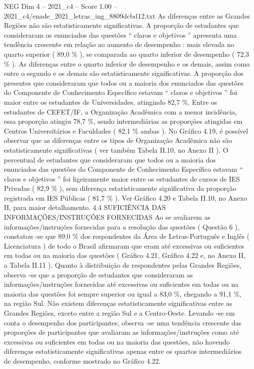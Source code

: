 \begin{textsample}{NEG Dim 4 – 2021\_c4 – Score 1.00 – 2021\_c4/enade\_2021\_letras\_ing\_8809dcbd12.txt}
As diferenças entre as Grandes Regiões não são estatisticamente significativas.
A proporção de estudantes que consideraram os enunciados das questões “ claros e objetivos ” apresenta uma tendência crescente em relação ao aumento de desempenho : mais elevada no quarto superior ( 89,0 \% ), se comparada ao quarto inferior de desempenho ( 72,3 \% ).
As diferenças entre o quarto inferior de desempenho e os demais, assim como entre o segundo e os demais são estatisticamente significativas.
A proporção dos presentes que consideraram que todos ou a maioria dos enunciados das questões do Componente de Conhecimento Específico estavam “ claros e objetivos ” foi maior entre os estudantes de Universidades, atingindo 82,7 \%.
Entre os estudantes de CEFET/IF, a Organização Acadêmica com a menor incidência, essa proporção atingiu 78,7 \%, sendo intermediárias as proporções atingidas em Centros Universitários e Faculdades ( 82,1 \% ambas ).
No Gráfico 4.19, é possível observar que as diferenças entre os tipos de Organização Acadêmica não são estatisticamente significativas ( ver também Tabela II.10, no Anexo II ).
O percentual de estudantes que consideraram que todos ou a maioria dos enunciados das questões do Componente de Conhecimento Específico estavam “ claros e objetivos ” foi ligeiramente maior entre os estudantes de cursos de IES Privadas ( 82,9 \% ), sem diferença estatisticamente significativa da proporção registrada em IES Públicas ( 81,7 \% ).
Ver Gráfico 4.20 e Tabela II.10, no Anexo II, para maior detalhamento. 4.4 SUFICIÊNCIA DAS INFORMAÇÕES/INSTRUÇÕES FORNECIDAS Ao se avaliarem as informações/instruções fornecidas para a resolução das questões ( Questão 6 ), constatou -se que 89,0 \% dos respondentes da Área de Letras-Português e Inglês ( Licenciatura ) de todo o Brasil afirmaram que eram até excessivas ou suficientes em todas ou na maioria das questões ( Gráfico 4.21, Gráfico 4.22 e, no Anexo II, a Tabela II.11 ).
Quanto à distribuição de respondentes pelas Grandes Regiões, observa -se que a proporção de estudantes que consideraram as informações/instruções fornecidas até excessivas ou suficientes em todas ou na maioria das questões foi sempre superior ou igual a 83,0 \%, chegando a 91,1 \%, na região Sul.
Não existem diferenças estatisticamente significativas entre as Grandes Regiões, exceto entre a região Sul e a Centro-Oeste.
Levando -se em conta o desempenho dos participantes, observa -se uma tendência crescente das proporções de participantes que avaliaram as informações/instruções como até excessivas ou suficientes em todas ou na maioria das questões, não havendo diferenças estatisticamente significativas apenas entre os quartos intermediários de desempenho, conforme mostrado no Gráfico 4.22.

\end{textsample}
